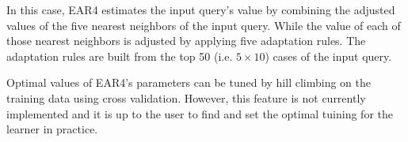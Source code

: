 \documentclass[a4paper]{article}
\begin{document}
In this case, EAR4 estimates the input query's value by combining the adjusted 
values of the five nearest neighbors of the input query. While the
value of each of those nearest neighbors is adjusted by applying five adaptation rules. 
The adaptation rules are built from the top 50 (i.e. $5 \times 10$) cases of the input 
query.

Optimal values of EAR4's parameters can be tuned by hill climbing on the training data using 
cross validation. However, this feature is not currently implemented and 
it is up to the user to find and set the optimal tuining for the learner in practice.
 

\end{document}
